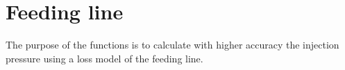\newpage
\chapter{Feeding line}
The purpose of the functions is to calculate with higher accuracy the injection pressure using a loss model of the feeding line.
